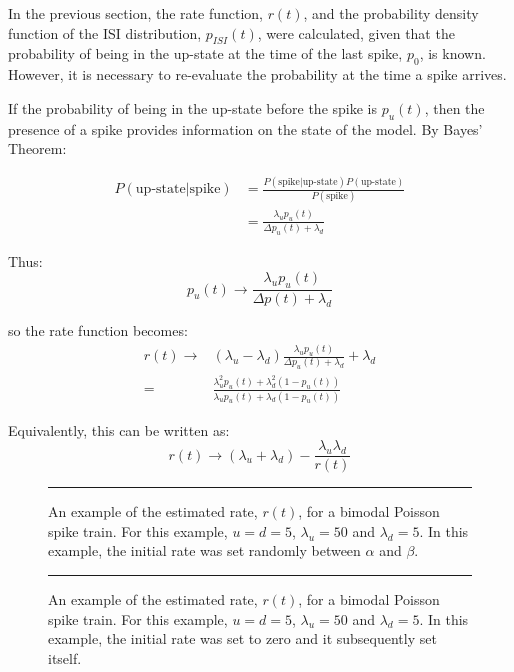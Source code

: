 In the previous section, the rate function, $r(t)$, and the probability density function of the ISI distribution, $p_{ISI}(t)$, were calculated, given that the probability of being in the up-state at the time of the last spike, $p_0$, is known.  However, it is necessary to re-evaluate the probability at the time a spike arrives.

If the probability of being in the up-state before the spike is $p_u(t)$, then the presence of a spike provides information on the state of the model. By Bayes' Theorem:

\begin{equation}
\begin{split}
P(\mbox{up-state} | \mbox{spike}) &= \frac{P(\mbox{spike}|\mbox{up-state})P(\mbox{up-state})}{P(\mbox{spike})} \\
&=\frac{\lambda_u p_u(t)}{\Delta p_u(t) + \lambda_d }
\end{split}
\end{equation}

Thus:
\begin{equation}
p_u(t) \rightarrow \frac{\lambda_u p_u(t)}{\Delta p(t) + \lambda_d}
\end{equation}

so the rate function becomes:
\begin{equation}
\begin{split}
r(t) \rightarrow &(\lambda_u - \lambda_d)\frac{\lambda_u p_u(t)}{\Delta p_u(t)+ \lambda_d} + \lambda_d\\
= & \frac{\lambda_u^2 p_u(t) + \lambda_d^2(1-p_u(t))}{\lambda_up_u(t) + \lambda_d(1-p_u(t))}
\end{split}
\end{equation}

Equivalently, this can be written as:
\begin{equation}
r(t) \rightarrow (\lambda_u +\lambda_d) - \frac{\lambda_u\lambda_d}{r(t)}
\end{equation}

\begin{figure}[htb]

\bigskip
\rule{31.5em}{0.5pt}
\caption{An example of the estimated rate, $r(t)$, for a bimodal Poisson spike train.  For this example, $u=d=5$, $\lambda_u=50$ and $\lambda_d=5$.  In this example, the initial rate was set randomly between $\alpha$ and $\beta$.}
\end{figure}

\begin{figure}

\bigskip
\rule{31.5em}{0.5pt}
\caption{An example of the estimated rate, $r(t)$, for a bimodal Poisson spike train.  For this example, $u=d=5$, $\lambda_u=50$ and $\lambda_d=5$.  In this example, the initial rate was set to zero and it subsequently set itself.}
\end{figure}

